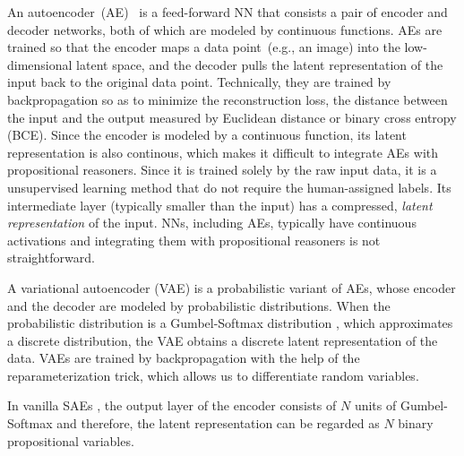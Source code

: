 An autoencoder~(AE)~\cite{hinton2006reducing} is a feed-forward NN that consists a pair of encoder and decoder networks, both of which are modeled by continuous functions.
AEs are trained so that the encoder maps a data point~(e.g., an image) into the low-dimensional latent space, and the decoder pulls the latent representation of the input back to the original data point.
Technically, they are trained by backpropagation so as to minimize the reconstruction loss, the distance between the input and the output measured by Euclidean distance or binary cross entropy (BCE).
Since the encoder is modeled by a continuous function, its latent representation is also continous, which makes it difficult to integrate AEs with propositional reasoners.
Since it is trained solely by the raw input data, it is a unsupervised learning method that do not require the human-assigned labels.
Its intermediate layer (typically smaller than the input) has a compressed, \emph{latent representation} of the input.
NNs, including AEs, typically have continuous activations and integrating them with propositional reasoners is not straightforward.
\fi

A variational autoencoder (VAE) \cite{kingma2013auto} is a probabilistic variant of AEs, whose encoder and the decoder are modeled by probabilistic distributions.
When the probabilistic distribution is a Gumbel-Softmax distribution \cite{jang2016categorical}, which approximates a discrete distribution, the VAE obtains a discrete latent representation of the data.
VAEs are trained by backpropagation with the help of the reparameterization trick, which allows us to differentiate random variables.


In vanilla SAEs \cite{Asai2018}, the output layer of the encoder consists of $N$ units of Gumbel-Softmax
and therefore, the latent representation can be regarded as $N$ binary propositional variables.



